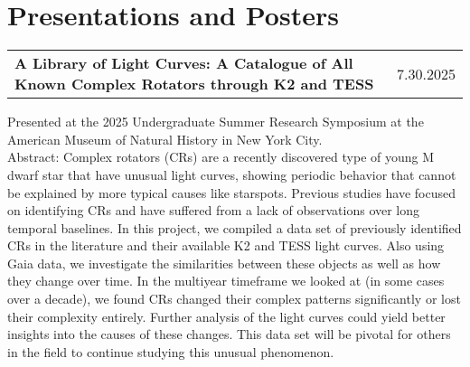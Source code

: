 \documentclass[a4paper,12pt]{article}
\makeatletter
\newenvironment{jobshort}[2]
    {
    \begin{tabularx}{\linewidth}{@{}X r@{}}
    {\raggedright\arraybackslash\nohyphens{#1}} & #2 \\[3.75pt]
    \end{tabularx}
    }
    {}
\makeatother
\begin{document}
\section{Presentations and Posters}
\begin{jobshort}{\textbf{A Library of Light Curves: A Catalogue of All Known Complex Rotators through K2 and TESS}}{7.30.2025}
Presented at the 2025 Undergraduate Summer Research Symposium at the American Museum of Natural History in New York City.\\
Abstract: Complex rotators (CRs) are a recently discovered type of young M dwarf star that have unusual light curves, showing periodic behavior that cannot be explained by more typical causes like starspots. Previous studies have focused on identifying CRs and have suffered from a lack of observations over long temporal baselines. In this project, we compiled a data set of previously identified CRs in the literature and their available K2 and TESS light curves. Also using Gaia data, we investigate the similarities between these objects as well as how they change over time. In the multiyear timeframe we looked at (in some cases over a decade), we found CRs changed their complex patterns significantly or lost their complexity entirely. Further analysis of the light curves could yield better insights into the causes of these changes. This data set will be pivotal for others in the field to continue studying this unusual phenomenon.
\end{jobshort}
\end{document}
